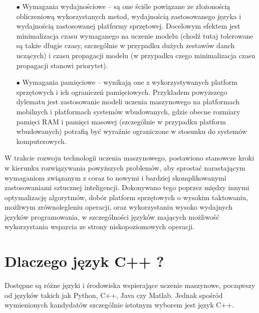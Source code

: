 \begin{itemize}
    \item [$\bullet$] Wymagania wydajnościowe -- są one ściśle powiązane ze złożonością obliczeniową wykorzystanych metod, wydajnością zastosowanego języka i wydajnością zastosowanej platformy sprzętowej. Docelowym efektem jest minimalizacja czasu wymaganego na uczenie modelu (chodź tutaj tolerowane są także długie czasy, szczególnie w przypadku dużych zestawów danch uczących) i czasu propagacji modelu (w przypadku czego minimalizacja czasu propagacji stanowi priorytet).
    
    \item [$\bullet$] Wymagania pamięciowe -- wynikają one z wykorzystywanych platform sprzętowych i ich ograniczeń pamięciowych. Przykładem powyższego dylematu jest zastosowanie modeli uczenia maszynowego na platformach mobilnych i platformach systemów wbudowanych, gdzie obecne rozmiary pamięci RAM i pamięci masowej (szczególnie w przypadku platform wbudowanych) potrafią być wyraźnie ograniczone w stosunku do systemów komputerowych.
\end{itemize}

W trakcie rozwoju technologii uczenia maszynowego, postawiono stanowcze kroki w kierunku rozwiązywania powyższych problemów, aby sprostać narastającym wymaganiom związanym z coraz to nowymi i bardziej skomplikowanymi zastosowaniami sztucznej inteligencji. Dokonywano tego poprzez między innymi optymalizację algorytmów, dobór platform sprzętowych o wysokim taktowaniu, możliwym zrównolegleniu operacji, oraz wykorzystaniu wysoko wydajnych języków programowania, w szczególności języków mających możliwość wykorzystania wsparcia ze strony niskopoziomowych operacji.

\section{Dlaczego język C++ ?}

Dostępne są różne języki i środowiska wspierające uczenie maszynowe, począwszy od języków takich jak Python, C++, Java czy Matlab. Jednak spośród wymienionych kandydatów szczególnie istotnym wyborem jest język C++. 

